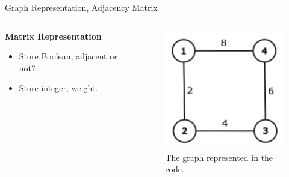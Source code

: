 \documentclass[aspectratio=169]{beamer}%
\begin{document}
\begin{frame}{Graph Representation, Adjacency Matrix}
    \begin{columns}
        \begin{column}{0.72\textwidth}
            \textbf{Matrix Representation}\\
            \begin{itemize}
                \item Store Boolean, adjacent or not?
                \item Store integer, weight.
            \end{itemize}
            
        \end{column}
        \hfill
        \begin{column}{0.24\textwidth}
            \begin{figure}
                \centering
                \includegraphics[width= 0.9\linewidth]{graph9.png}
                \caption{The graph represented in the code.}
            \end{figure}
        \end{column}
    \end{columns}
\end{frame}
\end{document}
